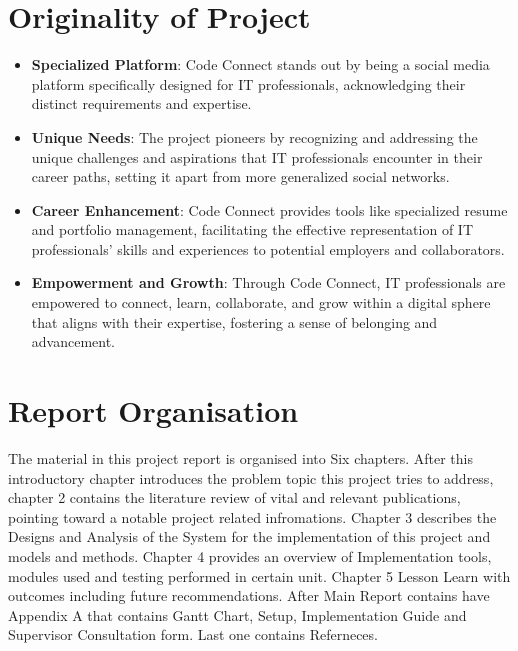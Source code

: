 \section{Originality of Project}

\begin{itemize}
    \item \textbf{Specialized Platform}: Code Connect stands out by being a social media platform specifically designed for IT professionals, acknowledging their distinct requirements and expertise.
    \item \textbf{Unique Needs}: The project pioneers by recognizing and addressing the unique challenges and aspirations that IT professionals encounter in their career paths, setting it apart from more generalized social networks.
    \item \textbf{Career Enhancement}: Code Connect provides tools like specialized resume and portfolio management, facilitating the effective representation of IT professionals' skills and experiences to potential employers and collaborators.
    \item \textbf{Empowerment and Growth}: Through Code Connect, IT professionals are empowered to connect, learn, collaborate, and grow within a digital sphere that aligns with their expertise, fostering a sense of belonging and advancement.
    
  \end{itemize}

\section{Report Organisation}
The material in this project report is organised into Six chapters. After this introductory chapter introduces the problem topic this project tries to address, chapter 2 contains the literature review of vital and relevant publications, pointing toward a notable project related infromations. Chapter 3 describes the Designs and Analysis of the System for the implementation of this project and models and methods. Chapter 4 provides an overview of Implementation tools, modules used and testing performed in certain unit. Chapter 5 Lesson Learn with outcomes including future recommendations. After Main Report contains have Appendix A that contains Gantt Chart, Setup, Implementation Guide and Supervisor Consultation form. Last one contains Referneces.